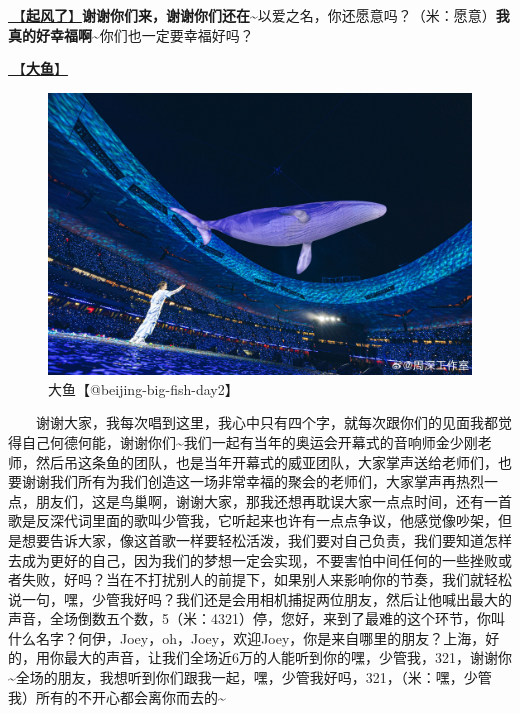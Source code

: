 \documentclass[]{ctexbook}
\begin{document}
\hyperref[the-wind-rises]{🎵【\textbf{起风了}】}\textbf{谢谢你们来，谢谢你们还在\textasciitilde{}}以爱之名，你还愿意吗？（米：愿意）\textbf{我真的好幸福啊\textasciitilde{}}你们也一定要幸福好吗？

\hyperref[big-fish]{🎵【\textbf{大鱼}】}

\begin{figure}

{\centering \includegraphics[width=400pt]{img/beijing20240922/big-fish} 

}

\caption{大鱼【@beijing-big-fish-day2】}\label{fig:unnamed-chunk-110}
\end{figure}

  谢谢大家，我每次唱到这里，我心中只有四个字，就每次跟你们的见面我都觉得自己何德何能，谢谢你们\textasciitilde 我们一起有当年的奥运会开幕式的音响师金少刚老师，然后吊这条鱼的团队，也是当年开幕式的威亚团队，大家掌声送给老师们，也要谢谢我们所有为我们创造这一场非常幸福的聚会的老师们，大家掌声再热烈一点，朋友们，这是鸟巢啊，谢谢大家，那我还想再耽误大家一点点时间，还有一首歌是反深代词里面的歌叫少管我，它听起来也许有一点点争议，他感觉像吵架，但是想要告诉大家，像这首歌一样要轻松活泼，我们要对自己负责，我们要知道怎样去成为更好的自己，因为我们的梦想一定会实现，不要害怕中间任何的一些挫败或者失败，好吗？当在不打扰别人的前提下，如果别人来影响你的节奏，我们就轻松说一句，嘿，少管我好吗？我们还是会用相机捕捉两位朋友，然后让他喊出最大的声音，全场倒数五个数，5（米：4321）停，您好，来到了最难的这个环节，你叫什么名字？何伊，Joey，oh，Joey，欢迎Joey，你是来自哪里的朋友？上海，好的，用你最大的声音，让我们全场近6万的人能听到你的嘿，少管我，321，谢谢你\textasciitilde 全场的朋友，我想听到你们跟我一起，嘿，少管我好吗，321，（米：嘿，少管我）所有的不开心都会离你而去的\textasciitilde{}
\end{document}
